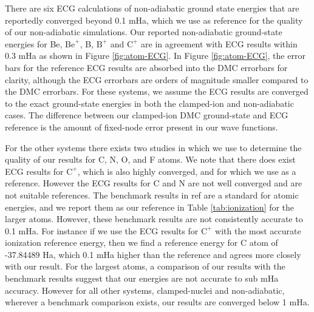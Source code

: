 \documentclass[pra,superscriptaddress,groupedaddress,twocolumn]{revtex4}
\begin{document}
There are six ECG calculations of non-adiabatic ground state energies that are reportedly converged beyond 0.1 mHa, which we use as reference for the quality of our non-adiabatic simulations. Our reported non-adiabatic ground-state energies for Be, $\text{Be}^+$, B, $\text{B}^+$ and $\text{C}^+$ are in agreement with ECG results within 0.3 mHa as shown in Figure \ref{fig:atom-ECG}. In Figure \ref{fig:atom-ECG}, the error bars for the reference ECG results are absorbed into the DMC errorbars for clarity, although the ECG errorbars are orders of magnitude smaller compared to the DMC errorbars. For these systems, we assume the ECG results are converged to the exact ground-state energies in both the clamped-ion and non-adiabatic cases.  The difference between our clamped-ion DMC ground-state and ECG reference is the amount of fixed-node error present in our wave functions.


For the other systems there exists two studies in which we use to determine the quality of our results for C, N, O, and F atoms. We note that there does exist ECG results for $\text{C}^+$, which is also highly converged, and for which we use as a reference. However the ECG results for C and N are not well converged and are not suitable references\cite{Bubin_C,Sharkey_N}. The benchmark results in ref \cite{Davidson_Atoms} are a standard for atomic energies, and we report them as our reference in Table \ref{tab:ionization} for the larger atoms.  However, these benchmark results are not consistently accurate to 0.1 mHa. For instance if we use the ECG results for $\text{C}^+$ with the most accurate ionization reference energy, then we find a reference energy for C atom of -37.84489 Ha, which 0.1 mHa higher than the reference and agrees more closely with our result. For the largest atoms, a comparison of our results with the benchmark results suggest that our energies are not accurate to sub mHa accuracy. However for all other systems, clamped-nuclei and non-adiabatic, wherever a benchmark comparison exists, our results are converged below 1 mHa.
\end{document}
